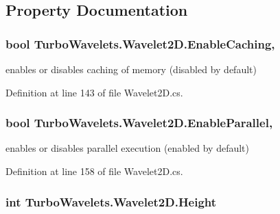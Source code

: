 \subsection{Property Documentation}
\hypertarget{class_turbo_wavelets_1_1_wavelet2_d_abbd41e51d24f8a7912ae47dd364ed4fb}{
\subsubsection[{Enable\+Caching}]{\setlength{\rightskip}{0pt plus 5cm}bool Turbo\+Wavelets.\+Wavelet2\+D.\+Enable\+Caching\hspace{0.3cm}{\ttfamily [get]}, {\ttfamily [set]}}}\label{class_turbo_wavelets_1_1_wavelet2_d_abbd41e51d24f8a7912ae47dd364ed4fb}


enables or disables caching of memory (disabled by default) 



Definition at line 143 of file Wavelet2\+D.\+cs.

\hypertarget{class_turbo_wavelets_1_1_wavelet2_d_abec21e54c6ab8cce0e02ef3ad64ae5af}{
\subsubsection[{Enable\+Parallel}]{\setlength{\rightskip}{0pt plus 5cm}bool Turbo\+Wavelets.\+Wavelet2\+D.\+Enable\+Parallel\hspace{0.3cm}{\ttfamily [get]}, {\ttfamily [set]}}}\label{class_turbo_wavelets_1_1_wavelet2_d_abec21e54c6ab8cce0e02ef3ad64ae5af}


enables or disables parallel execution (enabled by default) 



Definition at line 158 of file Wavelet2\+D.\+cs.

\hypertarget{class_turbo_wavelets_1_1_wavelet2_d_a277d0f89d73f839350c64a83ccd76ff6}{
\subsubsection[{Height}]{\setlength{\rightskip}{0pt plus 5cm}int Turbo\+Wavelets.\+Wavelet2\+D.\+Height\hspace{0.3cm}{\ttfamily [get]}}}\label{class_turbo_wavelets_1_1_wavelet2_d_a277d0f89d73f839350c64a83ccd76ff6}


